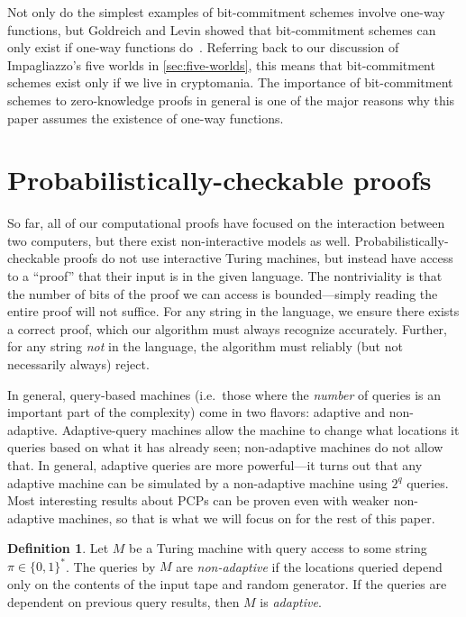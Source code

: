 \documentclass[english,12pt]{reedthesis}
\theoremstyle{plain}
\theoremstyle{definition}
\newtheorem{defn}[defn]{Definition}
\theoremstyle{remark}
\begin{document}
Not only do the simplest examples of bit-commitment schemes involve one-way
functions, but Goldreich and Levin showed that bit-commitment schemes can only
exist if one-way functions do~\cite{GL89}. Referring back to our discussion of
Impagliazzo's five worlds in \cref{sec:five-worlds}, this means that
bit-commitment schemes exist only if we live in cryptomania. The importance of
bit-commitment schemes to zero-knowledge proofs in general is one of the major
reasons why this paper assumes the existence of one-way functions.

\section{Probabilistically-checkable proofs}\label{sec:pcp}

So far, all of our computational proofs have focused on the interaction between
two computers, but there exist non-interactive models as well.
Probabilistically-checkable proofs do not use interactive Turing machines, but
instead have access to a ``proof'' that their input is in the given language.
The nontriviality is that the number of bits of the proof we can access is
bounded---simply reading the entire proof will not suffice. For any string in the
language, we ensure there exists a correct proof, which our algorithm must
always recognize accurately. Further, for any string \emph{not} in the language,
the algorithm must reliably (but not necessarily always) reject.

In general, query-based machines (i.e.\ those where the \emph{number} of queries
is an important part of the complexity) come in two flavors: adaptive and
non-adaptive. Adaptive-query machines allow the machine to change what locations
it queries based on what it has already seen; non-adaptive machines do not allow
that. In general, adaptive queries are more powerful---it turns out that any
adaptive machine can be simulated by a non-adaptive machine using $2^{q}$
queries. Most interesting results about PCPs can be proven even with weaker
non-adaptive machines, so that is what we will focus on for the rest of this
paper.

\begin{defn}\label{def:adaptive}
  Let $M$ be a Turing machine with query access to some string
  $\pi \in \{0, 1\}^{*}$. The queries by $M$ are \emph{non-adaptive} if the
  locations queried depend only on the contents of the input tape and random
  generator. If the queries are dependent on previous query results, then $M$ is
  \emph{adaptive}.
\end{defn}
\end{document}
